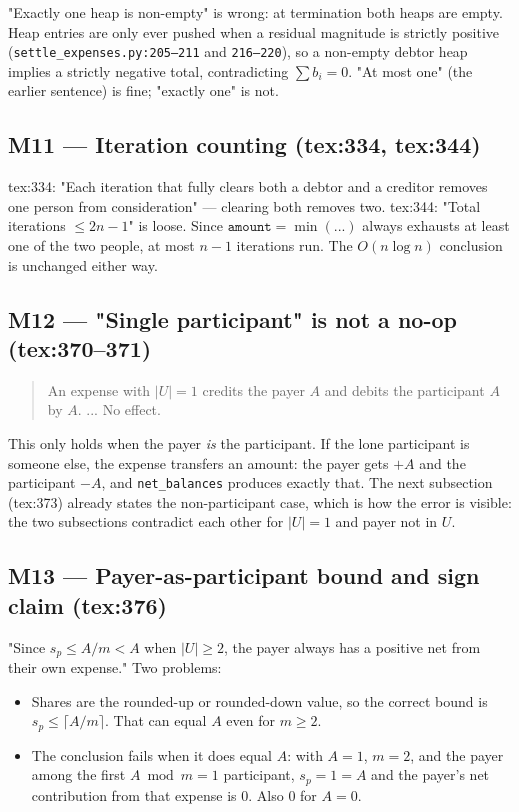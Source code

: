 \documentclass[11pt]{article}
\begin{document}
"Exactly one heap is non-empty" is wrong: at termination both heaps are empty. Heap entries are only ever
pushed when a residual magnitude is strictly positive (\texttt{settle\_expenses.py:205--211} and
\texttt{216--220}), so a non-empty debtor heap implies a strictly negative total, contradicting
$\sum b_i = 0$. "At most one" (the earlier sentence) is fine; "exactly one" is not.

\subsection{M11 --- Iteration counting (tex:334, tex:344)}

tex:334: "Each iteration that fully clears both a debtor and a creditor removes one person from
consideration" --- clearing both removes two. tex:344: "Total iterations $\le 2n-1$" is loose. Since
$\texttt{amount} = \min(...)$ always exhausts at least one of the two people, at most $n-1$ iterations
run. The $O(n \log n)$ conclusion is unchanged either way.

\subsection{M12 --- "Single participant" is not a no-op (tex:370--371)}

\begin{quote}
  An expense with $|U| = 1$ credits the payer $A$ and debits the participant $A$ by $A$. ... No effect.
\end{quote}

This only holds when the payer \emph{is} the participant. If the lone participant is someone else, the
expense transfers an amount: the payer gets $+A$ and the participant $-A$, and \texttt{net\_balances} produces
exactly that. The next subsection (tex:373) already states the non-participant case, which is how the
error is visible: the two subsections contradict each other for $|U|=1$ and payer not in $U$.

\subsection{M13 --- Payer-as-participant bound and sign claim (tex:376)}

"Since $s_p \le A/m < A$ when $|U| \ge 2$, the payer always has a positive net from their own expense."
Two problems:

\begin{itemize}
  \item Shares are the rounded-up or rounded-down value, so the correct bound is
$s_p \le \lceil A/m \rceil$. That can equal $A$ even for $m \ge 2$.
  \item The conclusion fails when it does equal $A$: with $A = 1$, $m = 2$, and the payer among the
first $A \bmod m = 1$ participant, $s_p = 1 = A$ and the payer's net contribution from that expense is
$0$. Also $0$ for $A = 0$.
\end{itemize}
\end{document}
